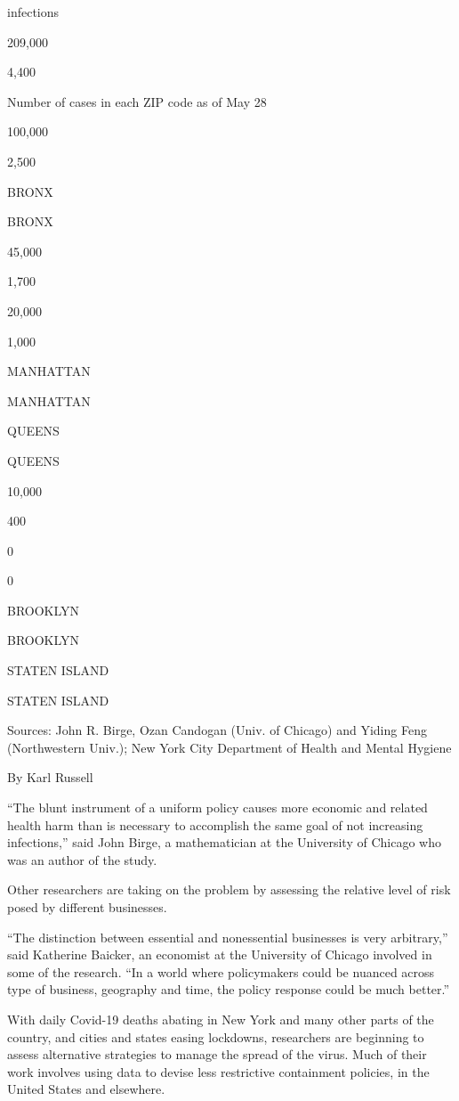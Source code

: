 infections

209,000

4,400

Number of cases in each ZIP code as of May 28

100,000

2,500

BRONX

BRONX

45,000

1,700

20,000

1,000

MANHATTAN

MANHATTAN

QUEENS

QUEENS

10,000

400

0

0

BROOKLYN

BROOKLYN

STATEN ISLAND

STATEN ISLAND

Sources: John R. Birge, Ozan Candogan (Univ. of Chicago) and Yiding Feng
(Northwestern Univ.); New York City Department of Health and Mental
Hygiene

By Karl Russell

``The blunt instrument of a uniform policy causes more economic and
related health harm than is necessary to accomplish the same goal of not
increasing infections,'' said John Birge, a mathematician at the
University of Chicago who was an author of the study.

Other researchers are taking on the problem by assessing the relative
level of risk posed by different businesses.

``The distinction between essential and nonessential businesses is very
arbitrary,'' said Katherine Baicker, an economist at the University of
Chicago involved in some of the research. ``In a world where
policymakers could be nuanced across type of business, geography and
time, the policy response could be much better.''

With daily Covid-19 deaths abating in New York and many other parts of
the country, and cities and states easing lockdowns, researchers are
beginning to assess alternative strategies to manage the spread of the
virus. Much of their work involves using data to devise less restrictive
containment policies, in the United States and elsewhere.

